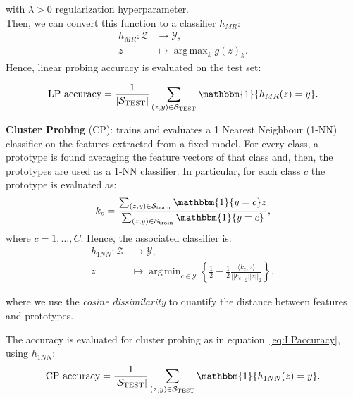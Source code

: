 \documentclass{article}
\DeclareMathOperator*{\argmax}{arg\,max}
\DeclareMathOperator*{\argmin}{arg\,min}
\begin{document}
with $\lambda > 0$ regularization hyperparameter.\\
Then, we can convert this function to a classifier $h_{MR}$:
\begin{equation*}
\begin{split}
    h_{MR}: \mathcal{Z} &\to \mathcal{Y},\\
    z &\mapsto \argmax_k g(z)_k.
\end{split}
\end{equation*}
Hence, linear probing accuracy is evaluated on the test set:

\begin{equation}
\label{eq:LPaccuracy}
    \text{LP accuracy} = \frac{1}{|\mathcal{S}_\text{TEST}|}\sum_{(z, y) \in \mathcal{S}_\text{TEST}}\mathbbm{1}\{h_{MR}(z) = y\}.
\end{equation}

\textbf{Cluster Probing} (CP): trains and evaluates a 1 Nearest Neighbour (1-NN) classifier on the features extracted from a fixed model. For every class, a prototype is found averaging the feature vectors of that class and, then, the prototypes are used as a 1-NN classifier.
In particular, for each class $c$ the prototype is evaluated as:
\begin{equation*}
    k_c = \frac{\sum_{(z, y) \in \mathcal{S}_\text{train}} \mathbbm{1}\{y=c\}z}{\sum_{(z, y) \in \mathcal{S}_\text{train}} \mathbbm{1}\{y=c\}},
\end{equation*}
where $c=1, \dots, C$. Hence, the associated classifier is:
\begin{equation*}
\begin{split}
\label{one_nn}
h_{1NN}: \mathcal{Z} &\to \mathcal{Y}, \\
z &\mapsto \argmin_{c \in \mathcal{Y}} \left\{\frac{1}{2} - \frac{1}{2}\frac{\langle k_c, z \rangle}{||k_c ||_2 ||z||_2}\right\},
\end{split}
\end{equation*}

where we use the \textit{cosine dissimilarity} to quantify the  distance between features and prototypes. %

The accuracy is evaluated for cluster probing as in equation~\ref{eq:LPaccuracy}, using $h_{1NN}$:
\begin{equation*}
\label{accuracy}
    \text{CP accuracy} = \frac{1}{|\mathcal{S}_\text{TEST}|}\sum_{(z, y) \in \mathcal{S}_\text{TEST}}\mathbbm{1}\{h_{1NN}(z) = y\}.
\end{equation*}
\end{document}
